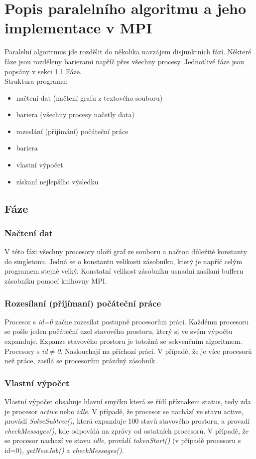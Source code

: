 \documentclass[11pt]{article}
\begin{document}
\section{Popis paralelního algoritmu a jeho implementace v MPI}
Paralelní algoritmus jde rozdělit do několika navzájem disjunktních fází. Některé fáze jsou rozděleny barierami napříč přes všechny procesy. Jednotlivé fáze jsou popsány v sekci \ref{Fáze} Fáze. \\
Struktura programu: 
\begin{itemize}
	\item načtení dat (načtení grafu z textového souboru)
	\item bariera (všechny procesy načetly data)
	\item rozeslání (příjímání) počáteční práce
	\item bariera
	\item vlastní výpočet
	\item získaní nejlepšího výsledku
\end{itemize}

\subsection{Fáze}
\label{Fáze}

\subsubsection{Načtení dat}
V této fázi všechny procesory uloží graf ze souboru a načtou důležité konstanty do singletonu. Jedná se o konstantu velikosti zásobníku, který je napříč celým programem stejně velký. Konstatní velikost zásobníku usnadní zasílaní bufferu zásobníku pomocí knihovny MPI.

\subsubsection{Rozesílaní (příjímaní) počáteční práce}
Procesor s \textit{id=0} začne rozesílat postupně procesorům práci. Každému procesoru se pošle jeden počáteční uzel stavového prostoru, který si ve svém výpočtu expanduje.
Expanze stavového prostoru je totožná se sekvenčním algoritmem. Procesory s \textit{id$\neq$0}. Naslouchají na příchozí práci. V případě, že je více procesorů než práce, zasílá se procesorům prázdný zásobník.
\newpage
\subsubsection{Vlastní výpočet}
Vlastní výpočet obsahuje hlavní smyčku která se řídí příznakem status, tedy zda je procesor \textit{active} nebo \textit{idle}. V případě, že procesor se nachází ve stavu active, provádí \textit{SolveSubtree()}, která expanduje 100 stavů stavového prostoru, a provadí \textit{checkMessages()}, kde odpovídá na zprávy od ostatních procesorů. V případě, že se procesor nachazí ve stavu \textit{idle}, provádí \textit{tokenStart()} (v případě procesoru s id=0), \textit{getNewJob()} a \textit{checkMessages()}.
\end{document}
